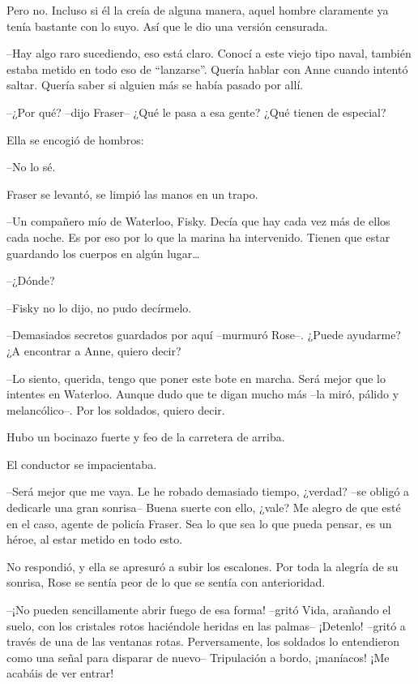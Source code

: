 {Pero no. Incluso si él la creía de alguna manera, aquel hombre
 claramente ya tenía bastante con lo suyo. Así que le dio una versión
censurada.}

{--Hay algo raro sucediendo, eso está claro. Conocí a este viejo tipo
 naval, también estaba metido en todo eso de ``lanzarse''. Quería hablar
 con Anne cuando intentó saltar. Quería saber si alguien más se había
pasado por allí.}

{--¿Por qué? --dijo Fraser-- ¿Qué le pasa a esa gente? ¿Qué tienen de
especial?}

{Ella se encogió de hombros:}

{--No lo sé.}

{Fraser se levantó, se limpió las manos en un trapo.}

{--Un compañero mío de Waterloo, Fisky. Decía que hay cada vez más de
 ellos cada noche. Es por eso por lo que la marina ha intervenido. Tienen
 que estar guardando los cuerpos en algún lugar\ldots{}}

{--¿Dónde?}

{--Fisky no lo dijo, no pudo decírmelo.}

{--Demasiados secretos guardados por aquí --murmuró Rose--. ¿Puede
ayudarme? ¿A encontrar a Anne, quiero decir?}

{--Lo siento, querida, tengo que poner este bote en marcha. Será mejor
 que lo intentes en Waterloo. Aunque dudo que te digan mucho más --la
miró, pálido y melancólico--. Por los soldados, quiero decir.}

{Hubo un bocinazo fuerte y feo de la carretera de arriba.}

{El conductor se impacientaba.}

{--Será mejor que me vaya. Le he robado demasiado tiempo, ¿verdad? --se
 obligó a dedicarle una gran sonrisa-- Buena suerte con ello, ¿vale? Me
 alegro de que esté en el caso, agente de policía Fraser. Sea lo que sea
lo que pueda pensar, es un héroe, al estar metido en todo esto.}

{No respondió, y ella se apresuró a subir los escalones. Por toda la
 alegría de su sonrisa, Rose se sentía peor de lo que se sentía con
anterioridad.}

\mbox{}

{--¡No pueden sencillamente abrir fuego de esa forma! --gritó Vida,
 arañando el suelo, con los cristales rotos haciéndole heridas en las
 palmas-- ¡Detenlo! --gritó a través de una de las ventanas rotas.
 Perversamente, los soldados lo entendieron como una señal para disparar
de nuevo-- Tripulación a bordo, ¡maníacos! ¡Me acabáis de ver entrar!}

